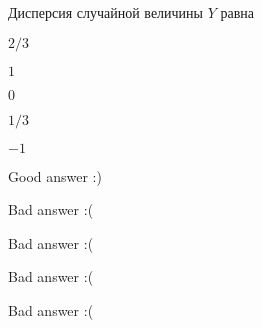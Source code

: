 
\begin{question}
Дисперсия случайной величины \(Y\) равна
\begin{answerlist}
  \item \(2/3\)
  \item \(1\)
  \item \(0\)
  \item \(1/3\)
  \item \(-1\)
\end{answerlist}
\end{question}

\begin{solution}
\begin{answerlist}
  \item Good answer :)
  \item Bad answer :(
  \item Bad answer :(
  \item Bad answer :(
  \item Bad answer :(
\end{answerlist}
\end{solution}

